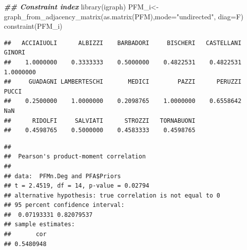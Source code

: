 \documentclass[
  notitlepage,
  onecolumn,
  openany]{book}
\newenvironment{Shaded}{\begin{snugshade}}{\end{snugshade}}
\newcommand{\AttributeTok}[1]{\textcolor[rgb]{0.77,0.63,0.00}{#1}}
\newcommand{\CommentTok}[1]{\textcolor[rgb]{0.56,0.35,0.01}{\textit{#1}}}
\newcommand{\DocumentationTok}[1]{\textcolor[rgb]{0.56,0.35,0.01}{\textbf{\textit{#1}}}}
\newcommand{\FunctionTok}[1]{\textcolor[rgb]{0.00,0.00,0.00}{#1}}
\newcommand{\NormalTok}[1]{#1}
\newcommand{\OtherTok}[1]{\textcolor[rgb]{0.56,0.35,0.01}{#1}}
\newcommand{\SpecialCharTok}[1]{\textcolor[rgb]{0.00,0.00,0.00}{#1}}
\newcommand{\StringTok}[1]{\textcolor[rgb]{0.31,0.60,0.02}{#1}}
\begin{document}
\begin{Shaded}
\begin{Highlighting}[]
\DocumentationTok{\#\# Constraint index}
\FunctionTok{library}\NormalTok{(igraph)}
\NormalTok{PFM\_i}\OtherTok{\textless{}{-}}\FunctionTok{graph\_from\_adjacency\_matrix}\NormalTok{(}\FunctionTok{as.matrix}\NormalTok{(PFM),}\AttributeTok{mode=}\StringTok{"undirected"}\NormalTok{, }\AttributeTok{diag=}\NormalTok{F)}
\FunctionTok{constraint}\NormalTok{(PFM\_i)}
\end{Highlighting}
\end{Shaded}

\begin{verbatim}
##   ACCIAIUOLI      ALBIZZI    BARBADORI     BISCHERI   CASTELLANI       GINORI 
##    1.0000000    0.3333333    0.5000000    0.4822531    0.4822531    1.0000000 
##     GUADAGNI LAMBERTESCHI       MEDICI        PAZZI      PERUZZI        PUCCI 
##    0.2500000    1.0000000    0.2098765    1.0000000    0.6558642          NaN 
##      RIDOLFI     SALVIATI      STROZZI   TORNABUONI 
##    0.4598765    0.5000000    0.4583333    0.4598765
\end{verbatim}

\begin{Shaded}
\end{Shaded}

\begin{verbatim}
## 
##  Pearson's product-moment correlation
## 
## data:  PFMn.Deg and PFA$Priors
## t = 2.4519, df = 14, p-value = 0.02794
## alternative hypothesis: true correlation is not equal to 0
## 95 percent confidence interval:
##  0.07193331 0.82079537
## sample estimates:
##       cor 
## 0.5480948
\end{verbatim}

\begin{Shaded}
\end{Shaded}
\end{document}
